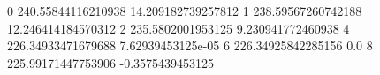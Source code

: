 0 240.55844116210938 14.209182739257812
1 238.59567260742188 12.246414184570312
2 235.5802001953125 9.230941772460938
4 226.34933471679688 7.62939453125e-05
6 226.34925842285156 0.0
8 225.99171447753906 -0.3575439453125
